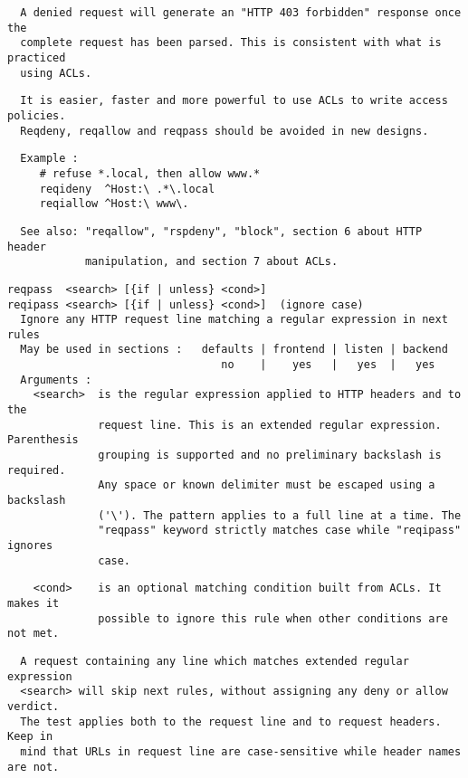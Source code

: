 \begin{verbatim}
  A denied request will generate an "HTTP 403 forbidden" response once the
  complete request has been parsed. This is consistent with what is practiced
  using ACLs.
\end{verbatim}

\begin{verbatim}
  It is easier, faster and more powerful to use ACLs to write access policies.
  Reqdeny, reqallow and reqpass should be avoided in new designs.
\end{verbatim}

\begin{verbatim}
  Example :
     # refuse *.local, then allow www.*
     reqideny  ^Host:\ .*\.local
     reqiallow ^Host:\ www\.
\end{verbatim}

\begin{verbatim}
  See also: "reqallow", "rspdeny", "block", section 6 about HTTP header
            manipulation, and section 7 about ACLs.
\end{verbatim}

\begin{verbatim}
reqpass  <search> [{if | unless} <cond>]
reqipass <search> [{if | unless} <cond>]  (ignore case)
  Ignore any HTTP request line matching a regular expression in next rules
  May be used in sections :   defaults | frontend | listen | backend
                                 no    |    yes   |   yes  |   yes
  Arguments :
    <search>  is the regular expression applied to HTTP headers and to the
              request line. This is an extended regular expression. Parenthesis
              grouping is supported and no preliminary backslash is required.
              Any space or known delimiter must be escaped using a backslash
              ('\'). The pattern applies to a full line at a time. The
              "reqpass" keyword strictly matches case while "reqipass" ignores
              case.
\end{verbatim}

\begin{verbatim}
    <cond>    is an optional matching condition built from ACLs. It makes it
              possible to ignore this rule when other conditions are not met.
\end{verbatim}

\begin{verbatim}
  A request containing any line which matches extended regular expression
  <search> will skip next rules, without assigning any deny or allow verdict.
  The test applies both to the request line and to request headers. Keep in
  mind that URLs in request line are case-sensitive while header names are not.
\end{verbatim}

